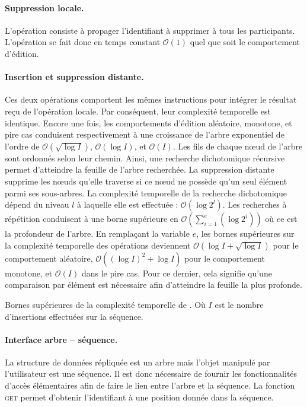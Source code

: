 \paragraph{Suppression locale.} L'opération consiste à propager l'identifiant à
supprimer à tous les participants. L'opération se fait donc en temps constant
$\mathcal{O}(1)$ quel que soit le comportement d'édition.

\paragraph{Insertion et suppression distante.} Ces deux opérations comportent
les mêmes instructions pour intégrer le résultat reçu de l'opération locale. Par
conséquent, leur complexité temporelle est identique. Encore une fois, les
comportements d'édition aléatoire, monotone, et pire cas conduisent
respectivement à une croissance de l'arbre exponentiel de l'ordre de
$\mathcal{O}(\sqrt{\log I})$, $\mathcal{O}(\log I)$, et $\mathcal{O}(I)$.  Les
fils de chaque nœud de l'arbre sont ordonnés selon leur chemin. Ainsi, une
recherche dichotomique récursive permet d'atteindre la feuille de l'arbre
recherchée. La suppression distante supprime les nœuds qu'elle traverse si ce
nœud ne possède qu'un seul élément parmi ses sous-arbres. La complexité
temporelle de la recherche dichotomique dépend du niveau $l$ à laquelle elle est
effectuée : $\mathcal{O}(\log 2^l)$. Les recherches à répétition conduisent à
une borne supérieure en
$\mathcal{O}(\textstyle\sum\nolimits_{i=1}^{e}(\log 2^i))$ où $e$e est la
profondeur de l'arbre. En remplaçant la variable $e$, les bornes supérieures sur
la complexité temporelle des opérations deviennent
$\mathcal{O}(\log I + \sqrt{\log I})$ pour le comportement aléatoire,
$\mathcal{O}((\log I)^2 + \log I)$ pour le comportement monotone, et
$\mathcal{O}(I)$ dans le pire cas. Pour ce dernier, cela signifie qu'une
comparaison par élément est nécessaire afin d'atteindre la feuille la plus
profonde.

\begin{table}
  \begin{center}
    \caption[Bornes supérieures de la complexité temporelle de \LSEQ]
    {\label{repl:table:lseqtime} Bornes supérieures de la complexité temporelle
      de \LSEQ. Où $I$ est le nombre d'insertions effectuées sur la séquence.}
    
  \end{center}
\end{table}


\paragraph{Interface arbre -- séquence.} La structure de données répliquée est
un arbre mais l'objet manipulé par l'utilisateur est une séquence. Il est donc
nécessaire de fournir les fonctionnalités d'accès élémentaires afin de faire le
lien entre l'arbre et la séquence.  La fonction \textsc{get} permet d'obtenir
l'identifiant à une position donnée dans la séquence.


